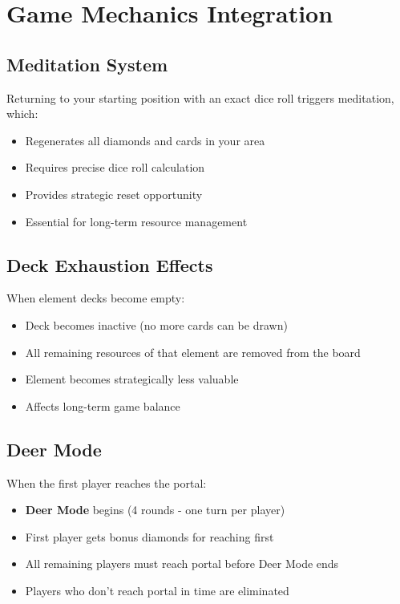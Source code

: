 \documentclass[12pt,a4paper]{article}
\begin{document}
\section{Game Mechanics Integration}

\subsection{Meditation System}
Returning to your starting position with an exact dice roll triggers meditation, which:
\begin{itemize}
    \item Regenerates all diamonds and cards in your area
    \item Requires precise dice roll calculation
    \item Provides strategic reset opportunity
    \item Essential for long-term resource management
\end{itemize}

\subsection{Deck Exhaustion Effects}
When element decks become empty:
\begin{itemize}
    \item Deck becomes inactive (no more cards can be drawn)
    \item All remaining resources of that element are removed from the board
    \item Element becomes strategically less valuable
    \item Affects long-term game balance
\end{itemize}

\subsection{Deer Mode}
When the first player reaches the portal:
\begin{itemize}
    \item \textbf{Deer Mode} begins (4 rounds - one turn per player)
    \item First player gets bonus diamonds for reaching first
    \item All remaining players must reach portal before Deer Mode ends
    \item Players who don't reach portal in time are eliminated
\end{itemize}
\end{document}
